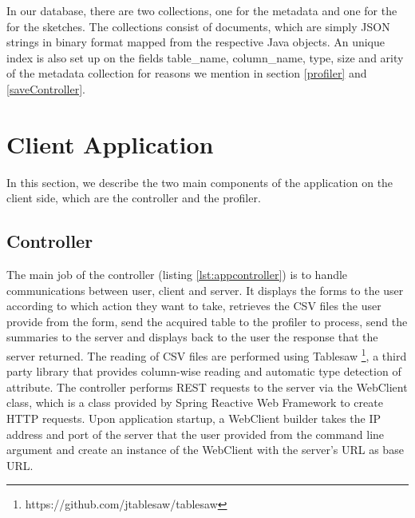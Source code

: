 In our database, there are two collections, one for the metadata and one for the for the sketches. The collections consist of documents, which are simply JSON strings in binary format mapped from the respective Java objects. An unique index is also set up on the fields table\_name, column\_name, type, size and arity of the metadata collection for reasons we mention in section \ref{profiler} and \ref{saveController}.

\section{Client Application}

In this section, we describe the two main components of the application on the client side, which are the controller and the profiler.

\subsection{Controller}

The main job of the controller (listing \ref{lst:appcontroller}) is to handle communications between user, client and server. It displays the forms to the user according to which action they want to take, retrieves the CSV files the user provide from the form, send the acquired table to the profiler to process, send the summaries to the server and displays back to the user the response that the server returned. The reading of CSV files are performed using Tablesaw \footnote{https://github.com/jtablesaw/tablesaw}, a third party library that provides column-wise reading and automatic type detection of attribute. The controller performs REST requests to the server via the WebClient class, which is a class provided by Spring Reactive Web Framework to create HTTP requests. Upon application startup, a WebClient builder takes the IP address and port of the server that the user provided from the command line argument and create an instance of the WebClient with the server's URL as base URL.

